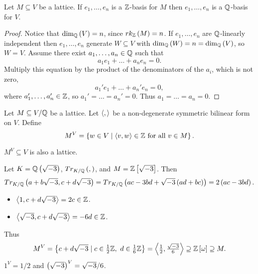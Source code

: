 \begin{lemma}
Let $ M \subseteq V $ be a lattice. If $ e_1, \dots, e_n $ is a $ \mathbb{Z} $-basis for $ M $ then $ e_1, \dots, e_n $ is a $ \mathbb{Q} $-basis for $ V $.
\end{lemma}

\begin{proof}
Notice that $ \dim_{\mathbb{Q}}\left( V \right) = n $, since $ rk_{\mathbb{Z}}\left( M \right) = n $. If $ e_1, \dots, e_n $ are $ \mathbb{Q} $-linearly independent then $ e_1, \dots, e_n $ generate $ W \subseteq V $ with $ \dim_{\mathbb{Q}}\left( W \right) = n = \dim_{\mathbb{Q}}\left( V \right) $, so $ W = V $. Assume there exist $ a_1, \dots, a_n \in \mathbb{Q} $ such that
$$ a_1e_1 + \dots + a_ne_n = 0. $$
Multiply this equation by the product of the denominators of the $ a_i $, which is not zero,
$$ a_1'e_1 + \dots + a_n'e_n = 0, $$
where $ a_1', \dots, a_n' \in \mathbb{Z} $, so $ a_1' = \dots = a_n' = 0 $. Thus $ a_1 = \dots = a_n = 0 $.
\end{proof}

Let $ M \subseteq V / \mathbb{Q} $ be a lattice. Let $ \left\langle , \right\rangle $ be a non-degenerate symmetric bilinear form on $ V $. Define
$$ M^V = \left\{ w \in V \mid \left\langle v, w \right\rangle \in \mathbb{Z} \ \text{for all} \ v \in M \right\}. $$

\begin{proposition}
\label{prop:duallattice}
$ M^V \subseteq V $ is also a lattice.
\end{proposition}

\begin{example*}
Let $ K = \mathbb{Q}\left( \sqrt{-3} \right) $, $ Tr_{K / \mathbb{Q}}\left( , \right) $, and $ M = \mathbb{Z}\left[ \sqrt{-3} \right] $. Then
$$ Tr_{K / \mathbb{Q}}\left( a + b\sqrt{-3}, c + d\sqrt{-3} \right) = Tr_{K / \mathbb{Q}}\left( ac - 3bd + \sqrt{-3}\left( ad + bc \right) \right) = 2\left( ac - 3bd \right). $$
\begin{itemize}
\item $ \left\langle 1, c + d\sqrt{-3} \right\rangle = 2c \in \mathbb{Z} $.
\item $ \left\langle \sqrt{-3}, c + d\sqrt{-3} \right\rangle = -6d \in \mathbb{Z} $.
\end{itemize}
Thus
$$ M^V = \left\{ c + d\sqrt{-3} \mid c \in \tfrac{1}{2}\mathbb{Z}, \ d \in \tfrac{1}{6}\mathbb{Z} \right\} = \left\langle \tfrac{1}{2}, \tfrac{\sqrt{-3}}{6} \right\rangle \supseteq \mathbb{Z}\left[ \omega \right] \supseteq M. $$
$ 1^V = 1 / 2 $ and $ \left( \sqrt{-3} \right)^V = \sqrt{-3} / 6 $.
\end{example*}

